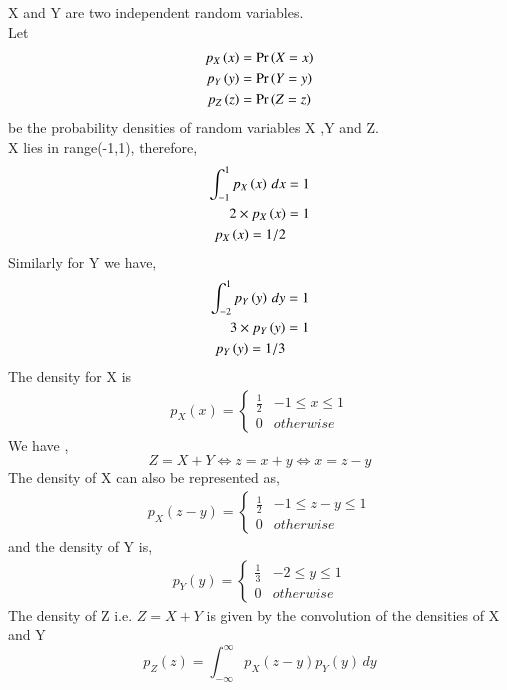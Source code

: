 


X and Y are two independent random variables. \\
Let
\begin{align}
    p_X\left(x\right) &= \Pr\left(X=x\right) \\
    p_Y\left(y\right) &= \Pr\left(Y=y\right)  \\
    p_Z\left(z\right) &= \Pr\left(Z=z\right)
\end{align}
be the probability densities of random variables X ,Y and Z. \\
X lies in range(-1,1), therefore,
\begin{align}
    \int_{-1}^{1} p_X\left(x\right) \,dx  &=1 \\
    2 \times p_X\left(x\right)  &= 1 \\
     p_X\left(x\right) =1 /2
\end{align}
Similarly for Y we have,
\begin{align}
    \int_{-2}^{1} p_Y\left(y\right) \,dy  &=1 \\
    3 \times p_Y\left(y\right)  &= 1  \\
     p_Y\left(y\right) =1 /3
\end{align}
The density for X is \\
\begin{align}
\label{eq:_pdf_x}
p_{X}(x)  = 
\begin{cases}
\frac{1}{2} & -1 \le x \le 1
\\
0 & otherwise
\end{cases}
\end{align}
We have ,
\begin{equation}
    Z= X+Y \iff z= x+ y \iff x = z-y
\end{equation}
The density of X can also be represented as,
\begin{align}
\label{eq:pdf_x}
p_{X}(z-y)  = 
\begin{cases}
\frac{1}{2} & -1 \le z-y \le 1
\\
0 & otherwise
\end{cases}
\end{align}
and the density of Y is,
\begin{align}
\label{eq:pdf_y}
p_{Y}(y)  = 
\begin{cases}
\frac{1}{3} & -2 \le y \le 1
\\
0 & otherwise
\end{cases}
\end{align}
The density of Z i.e. $Z= X + Y $ is given by the convolution of the densities of X and Y
\begin{equation}
    p_Z(z) =  \int_{- \infty}^{\infty} p_X(z-y)p_Y(y) \,dy 
\end{equation}
